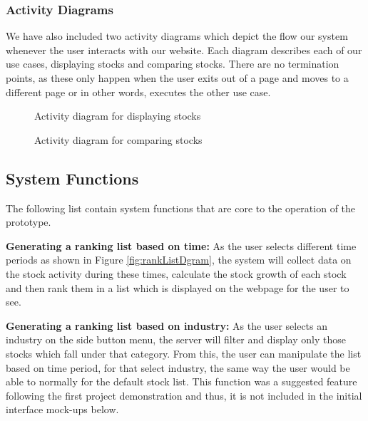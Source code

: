 \documentclass[11pt]{article}
\numberwithin{figure}{section}
\begin{document}
        \subsubsection{Activity Diagrams}
            We have also included two activity diagrams which depict the flow our system whenever the user interacts with our website. Each diagram describes each of our use cases, displaying stocks and comparing stocks. There are no termination points, as these only happen when the user exits out of a page and moves to a different page or in other words, executes the other use case.
        
            \begin{figure}[htp]
                \centering
                \caption{Activity diagram for displaying stocks}
                \label{}
            \end{figure}
         
            \begin{figure}[htp]
                \centering
                \caption{Activity diagram for comparing stocks}
                \label{}
            \end{figure}
        
        \clearpage
        
        
    \subsection{System Functions} 
    The following list contain system functions that are core to the operation of the prototype.
    
    \bigskip
    \noindent
    {\bfseries Generating a ranking list based on time:} As the user selects different time periods as shown in Figure \ref{fig:rankListDgram}, the system will collect data on the stock activity during these times, calculate the stock growth of each stock and then rank them in a list which is displayed on the webpage for the user to see.
    
    \bigskip
    \noindent
    {\bfseries Generating a ranking list based on industry:} As the user selects an industry on the side button menu, the server will filter and display only those stocks which fall under that category. From this, the user can manipulate the list based on time period, for that select industry, the same way the user would be able to normally for the default stock list. This function was a suggested feature following the first project demonstration and thus, it is not included in the initial interface mock-ups below.
    
\end{document}

